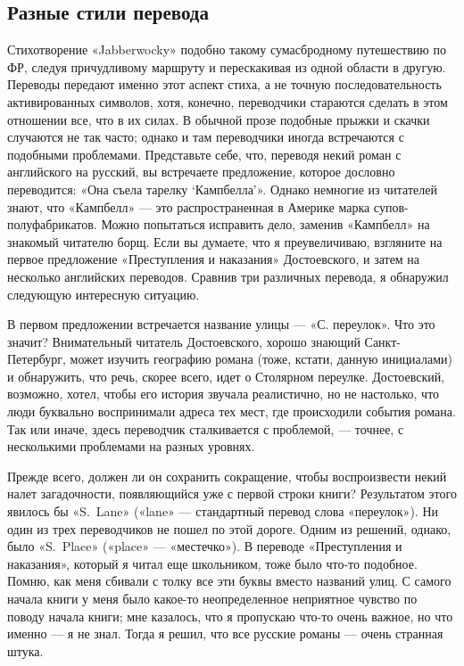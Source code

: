 \documentclass[../main.tex]{subfiles}
\begin{document}
\subsection{Разные стили перевода}

Стихотворение «Jabberwocky» подобно такому сумасбродному путешествию по ФР, следуя причудливому маршруту и перескакивая из одной области в другую. Переводы передают именно этот аспект стиха, а не точную последовательность активированных символов, хотя, конечно, переводчики стараются сделать в этом отношении все, что в их силах. В обычной прозе подобные прыжки и скачки случаются не так часто; однако и там переводчики иногда встречаются с подобными проблемами. Представьте себе, что, переводя некий роман с английского на русский, вы встречаете предложение, которое дословно переводится: «Она съела тарелку \enquote*{Кампбелла}». Однако немногие из читателей знают, что «Кампбелл» --- это распространенная в Америке марка супов-полуфабрикатов. Можно попытаться исправить дело, заменив «Кампбелл» на знакомый читателю борщ. Если вы думаете, что я преувеличиваю, взгляните на первое предложение «Преступления и наказания» Достоевского, и затем на несколько английских переводов. Сравнив три различных перевода, я обнаружил следующую интересную ситуацию.

В первом предложении встречается название улицы --- «С. переулок». Что это значит? Внимательный читатель Достоевского, хорошо знающий Санкт-Петербург, может изучить географию романа (тоже, кстати, данную инициалами) и обнаружить, что речь, скорее всего, идет о Столярном переулке. Достоевский, возможно, хотел, чтобы его история звучала реалистично, но не настолько, что люди буквально воспринимали адреса тех мест, где происходили события романа. Так или иначе, здесь переводчик сталкивается с проблемой, --- точнее, с несколькими проблемами на разных уровнях.

Прежде всего, должен ли он сохранить сокращение, чтобы воспроизвести некий налет загадочности, появляющийся уже с первой строки книги? Результатом этого явилось бы «S.~Lane» («lane» --- стандартный перевод слова «переулок»). Ни один из трех переводчиков не пошел по этой дороге. Одним из решений, однако, было «S.~Place» («place» --- «местечко»). В переводе «Преступления и наказания», который я читал еще школьником, тоже было что-то подобное. Помню, как меня сбивали с толку все эти буквы вместо названий улиц. С самого начала книги у меня было какое-то неопределенное неприятное чувство по поводу начала книги; мне казалось, что я пропускаю что-то очень важное, но что именно --- я не знал. Тогда я решил, что все русские романы --- очень странная штука.
\end{document}
